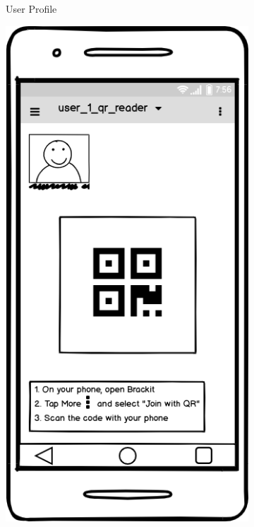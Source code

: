 \documentclass{article}
\begin{document}
\begin{figure}[!htb]
\begin{subfigure}{0.3\textwidth}
        \caption{User Profile} \label{fig:x_a}
    \end{subfigure}
    \hspace*{\fill}
    \begin{subfigure}{0.3\textwidth}
        \includegraphics[width=\linewidth]{figs/user_1_qr_reader.png}

\end{subfigure}
\end{figure}
\end{document}
